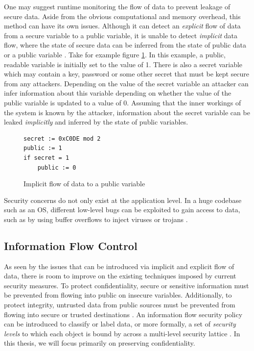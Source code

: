 \documentclass[twocolumn]{article}
\begin{document}
One may suggest runtime monitoring the flow of data to prevent leakage of secure data. Aside from the obvious computational and memory overhead, this method can have its own issues. Although it can detect an \textit{explicit} flow of data from a secure variable to a public variable, it is unable to detect \textit{implicit} data flow, where the state of secure data can be inferred from the state of public data or a public variable \cite{denning1977certification}. Take for example figure \ref{fig:implicit}. In this example, a public, readable variable is initially set to the value of 1. There is also a secret variable which may contain a key, password or some other secret that must be kept secure from any attackers. Depending on the value of the secret variable an attacker can infer information about this variable depending on whether the value of the public variable is updated to a value of 0. Assuming that the inner workings of the system is known by the attacker, information about the secret variable can be leaked \textit{implicitly} and inferred by the state of public variables.

\begin{figure}
    \begin{lstlisting}
secret := 0xC0DE mod 2
public := 1
if secret = 1
    public := 0
        \end{lstlisting}
    \caption{Implicit flow of data to a public variable}
    \label{fig:implicit}
\end{figure}

Security concerns do not only exist at the application level. In a huge codebase such as an OS, different low-level bugs can be exploited to gain access to data, such as by using buffer overflows to inject viruses or trojans \cite{agten2012recent}.

\subsection{Information Flow Control}
As seen by the issues that can be introduced via implicit and explicit flow of data, there is room to improve on the existing techniques imposed by current security measures. To protect confidentiality, secure or sensitive information must be prevented from flowing into public on insecure variables. Additionally, to protect integrity, untrusted data from public sources must be prevented from flowing into secure or trusted destinations \cite{balliu2014logics}. An information flow security policy can be introduced to classify or label data, or more formally, a set of \textit{security levels} to which each object is bound by across a multi-level security lattice \cite{denning1976lattice}. In this thesis, we will focus primarily on preserving confidentiality.
\end{document}
